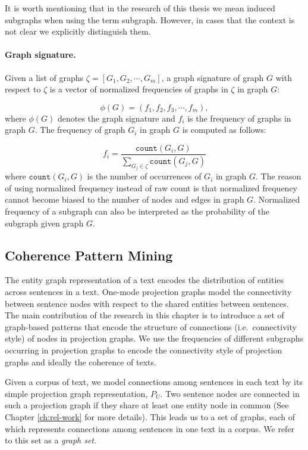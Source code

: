 It is worth mentioning that in the research of this thesis we mean induced subgraphs when using the term subgraph. 
However, in cases that the context is not clear we explicitly distinguish them. 

\paragraph{Graph signature.}
%
Given a list of graphs $ \zeta  = \left[ G_1, G_2, \cdots , G_m \right]$,  a graph signature of graph $G$ with respect to $\zeta$ is a vector of normalized frequencies of graphs in $\zeta$ in graph $G$:

\begin{equation}
	\phi \left( G \right) = \left( f_1, f_2, f_3, \cdots, f_m \right),
\end{equation}
where  $\phi \left( G \right)$ denotes the graph signature and $f_i$ is the frequency of graphs in graph $G$. 
The frequency of graph $G_i$ in graph $G$ is computed as follows:

\begin{equation}
 f_i = \frac{\mathtt{count}(G_i, G)}{\sum_{G_j \in \zeta}{\mathtt{count}(G_j, G)}}
\end{equation}
where $\mathtt{count}(G_i, G)$ is the number of occurrences of $G_i$ in graph $G$. 
The reason of using normalized frequency instead of raw count is that normalized frequency cannot become biased to the number of nodes and edges in graph $G$. 
Normalized frequency of a subgraph can also be interpreted as the probability of the subgraph given graph $G$.  

\subsection{Coherence Pattern Mining}

The entity graph representation of a text encodes the distribution of entities across sentences in a text. 
One-mode projection graphs model the connectivity between sentence nodes with respect to the shared entities between sentences. 
The main contribution of the research in this chapter is to introduce a set of graph-based patterns that encode the structure of connections (i.e.\ connectivity style) of nodes in projection graphs.  
We use the frequencies of different subgraphs occurring in projection graphs to encode the connectivity style of projection graphs and ideally the coherence of texts. 

Given a corpus of text, we model connections among sentences in each text by its simple projection graph representation, $P_U$. 
Two sentence nodes are connected in such a projection graph if they share at least one entity node in common (See Chapter \ref{ch:rel-work} for more details).  
This leads us to a set of graphs, each of which represents connections among sentences in one text in a corpus.   
We refer to this set as a \emph{graph set}. 

